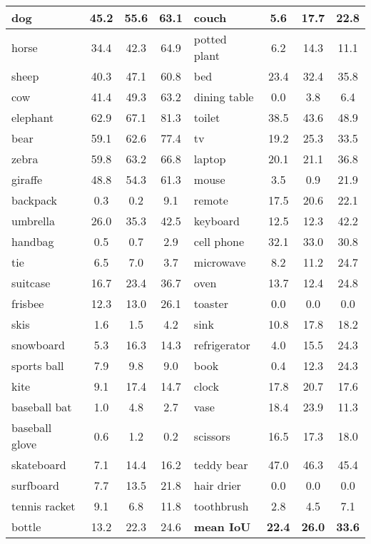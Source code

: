 \documentclass[journal]{IEEEtran}
\begin{document}
\begin{table}[htbp]
\begin{minipage}{1\linewidth}
{\begin{tabular}{l|c|c|c||l|c|c|c}
				dog             &45.2 &55.6 &63.1 &couch           &5.6  &17.7 &22.8 \\ \hline 
				horse           &34.4 &42.3 &64.9 &potted plant    &6.2  &14.3 &11.1 \\ \hline 
				sheep           &40.3 &47.1 &60.8 &bed             &23.4 &32.4 &35.8 \\ \hline 
				cow             &41.4 &49.3 &63.2 &dining table    &0.0  &3.8  &6.4  \\ \hline 
				elephant        &62.9 &67.1 &81.3 &toilet          &38.5 &43.6 &48.9 \\ \hline 
				bear            &59.1 &62.6 &77.4 &tv              &19.2 &25.3 &33.5 \\ \hline 
				zebra           &59.8 &63.2 &66.8 &laptop          &20.1 &21.1 &36.8 \\ \hline 
				giraffe         &48.8 &54.3 &61.3 &mouse           &3.5  &0.9  &21.9 \\ \hline 
				backpack        &0.3  &0.2  &9.1  &remote          &17.5 &20.6 &22.1 \\ \hline 
				umbrella        &26.0 &35.3 &42.5 &keyboard        &12.5 &12.3 &42.2 \\ \hline 
				handbag         &0.5  &0.7  &2.9  &cell phone      &32.1 &33.0 &30.8 \\ \hline 
				tie             &6.5  &7.0  &3.7  &microwave       &8.2  &11.2 &24.7 \\ \hline 
				suitcase        &16.7 &23.4 &36.7 &oven            &13.7 &12.4 &24.8 \\ \hline 
				frisbee         &12.3 &13.0 &26.1 &toaster         &0.0  &0.0  &0.0  \\ \hline 
				skis            &1.6  &1.5  &4.2  &sink            &10.8 &17.8 &18.2 \\ \hline 
				snowboard       &5.3  &16.3 &14.3 &refrigerator    &4.0  &15.5 &24.3 \\ \hline 
				sports ball     &7.9  &9.8  &9.0  &book            &0.4  &12.3 &24.3 \\ \hline 
				kite            &9.1  &17.4 &14.7 &clock           &17.8 &20.7 &17.6 \\ \hline 
				baseball bat    &1.0  &4.8  &2.7  &vase            &18.4 &23.9 &11.3 \\ \hline 
				baseball glove  &0.6  &1.2  &0.2  &scissors        &16.5 &17.3 &18.0 \\ \hline 
				skateboard      &7.1  &14.4 &16.2 &teddy bear      &47.0 &46.3 &45.4 \\ \hline 
				surfboard       &7.7  &13.5 &21.8 &hair drier      &0.0  &0.0  &0.0  \\ \hline 
				tennis racket   &9.1  &6.8  &11.8 &toothbrush      &2.8  &4.5  &7.1  \\ \hline 
				bottle          &13.2 &22.3 &24.6 &\textbf{mean IoU} &\textbf{22.4} &\textbf{26.0} &\textbf{33.6} \\ \hline 
				
			\end{tabular}
		}
	\end{minipage}
\end{table}
\end{document}
